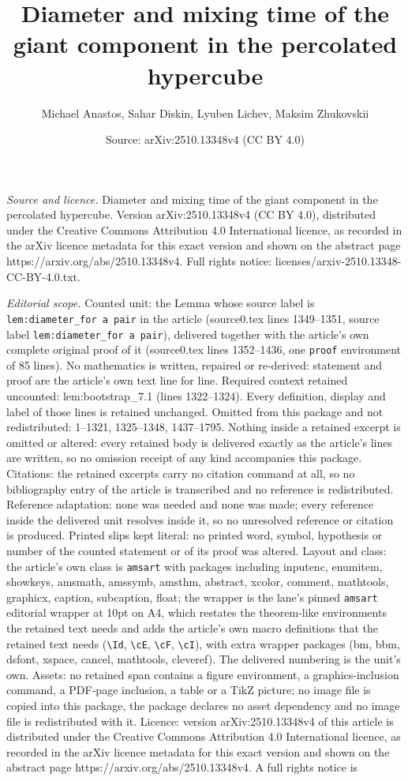 \documentclass[10pt,a4paper]{amsart}
\title[Diameter and mixing time of the giant component in the perco]{Diameter and mixing time of the giant component in the percolated hypercube}
\author{Michael Anastos, Sahar Diskin, Lyuben Lichev, Maksim Zhukovskii}
\date{Source: arXiv:2510.13348v4 (CC BY 4.0)}
\begin{document}
\maketitle

\noindent\emph{Source and licence.} Diameter and mixing time of the giant component in the percolated hypercube. Version arXiv:2510.13348v4 (CC BY 4.0), distributed under the Creative Commons Attribution 4.0 International licence, as recorded in the arXiv licence metadata for this exact version and shown on the abstract page https://arxiv.org/abs/2510.13348v4. Full rights notice: licenses/arxiv-2510.13348-CC-BY-4.0.txt.\par\smallskip

\noindent\textit{Editorial scope.} Counted unit: the Lemma whose source label is \texttt{lem:diameter\_for a pair} in the article (source0.tex lines 1349--1351, source label \texttt{lem:diameter\_for a pair}), delivered together with the article's own complete original proof of it (source0.tex lines 1352--1436, one \texttt{proof} environment of 85 lines). No mathematics is written, repaired or re-derived: statement and proof are the article's own text line for line. Required context retained uncounted: lem:bootstrap\_7.1 (lines 1322--1324). Every definition, display and label of those lines is retained unchanged. Omitted from this package and not redistributed: 1--1321, 1325--1348, 1437--1795. Nothing inside a retained excerpt is omitted or altered: every retained body is delivered exactly as the article's lines are written, so no omission receipt of any kind accompanies this package. Citations: the retained excerpts carry no citation command at all, so no bibliography entry of the article is transcribed and no reference is redistributed. Reference adaptation: none was needed and none was made; every reference inside the delivered unit resolves inside it, so no unresolved reference or citation is produced. Printed slips kept literal: no printed word, symbol, hypothesis or number of the counted statement or of its proof was altered. Layout and class: the article's own class is \texttt{amsart} with packages including inputenc, enumitem, showkeys, amsmath, amssymb, amsthm, abstract, xcolor, comment, mathtools, graphicx, caption, subcaption, float; the wrapper is the lane's pinned \texttt{amsart} editorial wrapper at 10pt on A4, which restates the theorem-like environments the retained text needs and adds the article's own macro definitions that the retained text needs (\texttt{\textbackslash Id}, \texttt{\textbackslash cE}, \texttt{\textbackslash cF}, \texttt{\textbackslash cI}), with extra wrapper packages (bm, bbm, dsfont, xspace, cancel, mathtools, cleveref). The delivered numbering is the unit's own. Assets: no retained span contains a figure environment, a graphics-inclusion command, a PDF-page inclusion, a table or a TikZ picture; no image file is copied into this package, the package declares no asset dependency and no image file is redistributed with it. Licence: version arXiv:2510.13348v4 of this article is distributed under the Creative Commons Attribution 4.0 International licence, as recorded in the arXiv licence metadata for this exact version and shown on the abstract page https://arxiv.org/abs/2510.13348v4. A full rights notice is 
\end{document}
